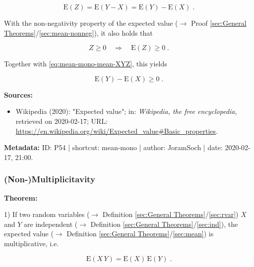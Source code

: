 \documentclass[a4paper,12pt,twoside]{book}
\begin{document}
\begin{equation} \label{eq:mean-mono-mean-XYZ}
\mathrm{E}(Z) = \mathrm{E}(Y-X) = \mathrm{E}(Y) - \mathrm{E}(X) \; .
\end{equation}

With the non-negativity property of the expected value ($\rightarrow$ Proof \ref{sec:General Theorems}/\ref{sec:mean-nonneg}), it also holds that

\begin{equation} \label{eq:mean-mono-mean-Z}
Z \geq 0 \quad \Rightarrow \quad \mathrm{E}(Z) \geq 0 \; .
\end{equation}

Together with \eqref{eq:mean-mono-mean-XYZ}, this yields

\begin{equation} \label{eq:mean-mono-mean-mono-qed}
\mathrm{E}(Y) - \mathrm{E}(X) \geq 0 \; .
\end{equation}


\vspace{1em}
\textbf{Sources:}
\begin{itemize}
\item Wikipedia (2020): "Expected value"; in: \textit{Wikipedia, the free encyclopedia}, retrieved on 2020-02-17; URL: \url{https://en.wikipedia.org/wiki/Expected_value#Basic_properties}.
\end{itemize}


\vspace{1em}
\textbf{Metadata:} ID: P54 | shortcut: mean-mono | author: JoramSoch | date: 2020-02-17, 21:00.
\vspace{1em}



\subsubsection[\textbf{(Non-)Multiplicitavity}]{(Non-)Multiplicitavity} \label{sec:mean-mult}
\setcounter{equation}{0}

\textbf{Theorem:}

1) If two random variables ($\rightarrow$ Definition \ref{sec:General Theorems}/\ref{sec:rvar}) $X$ and $Y$ are independent ($\rightarrow$ Definition \ref{sec:General Theorems}/\ref{sec:ind}), the expected value ($\rightarrow$ Definition \ref{sec:General Theorems}/\ref{sec:mean}) is multiplicative, i.e.

\begin{equation} \label{eq:mean-mult-mean-mult}
\mathrm{E}(X\,Y) = \mathrm{E}(X) \, \mathrm{E}(Y) \; .
\end{equation}
\end{document}
